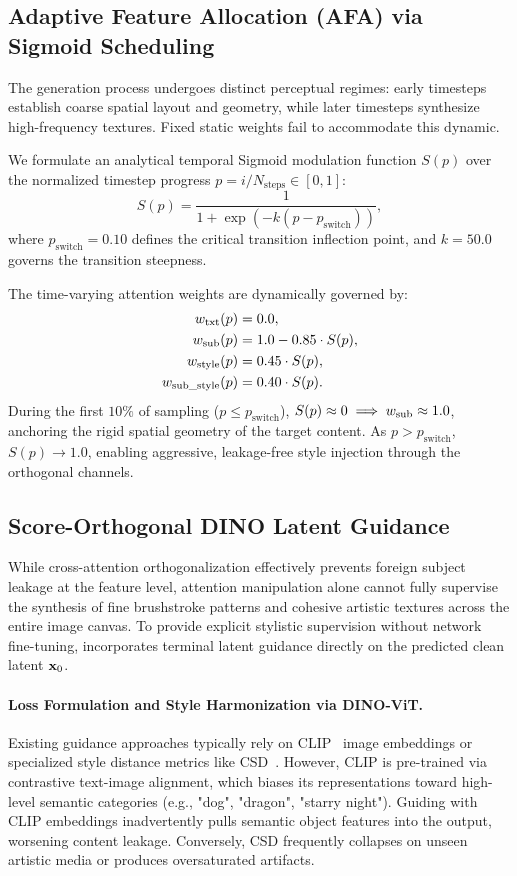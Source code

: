 \subsection{Adaptive Feature Allocation (AFA) via Sigmoid Scheduling}
\label{subsec:afa}
The generation process undergoes distinct perceptual regimes: early timesteps establish coarse spatial layout and geometry, while later timesteps synthesize high-frequency textures. Fixed static weights fail to accommodate this dynamic.

We formulate an analytical temporal Sigmoid modulation function $S(p)$ over the normalized timestep progress $p = i / N_{\text{steps}} \in [0, 1]$:
\begin{equation}
    S(p) = \frac{1}{1 + \exp\left( -k (p - p_{\text{switch}}) \right)},
    \label{eq:sigmoid_schedule}
\end{equation}
where $p_{\text{switch}} = 0.10$ defines the critical transition inflection point, and $k = 50.0$ governs the transition steepness.

The time-varying attention weights are dynamically governed by:
\begin{align}
    w_{\text{txt}}(p) &= 0.0, \\
    w_{\text{sub}}(p) &= 1.0 - 0.85 \cdot S(p), \\
    w_{\text{style}}(p) &= 0.45 \cdot S(p), \\
    w_{\text{sub\_style}}(p) &= 0.40 \cdot S(p).
\end{align}
During the first $10\%$ of sampling ($p \le p_{\text{switch}}$), $S(p) \approx 0 \implies w_{\text{sub}} \approx 1.0$, anchoring the rigid spatial geometry of the target content. As $p > p_{\text{switch}}$, $S(p) \to 1.0$, enabling aggressive, leakage-free style injection through the orthogonal channels.

\subsection{Score-Orthogonal DINO Latent Guidance}
\label{subsec:score_ortho}
While cross-attention orthogonalization effectively prevents foreign subject leakage at the feature level, attention manipulation alone cannot fully supervise the synthesis of fine brushstroke patterns and cohesive artistic textures across the entire image canvas. To provide explicit stylistic supervision without network fine-tuning, \method incorporates terminal latent guidance directly on the predicted clean latent $\mathbf{x}_0$.

\paragraph{Loss Formulation and Style Harmonization via DINO-ViT.}
Existing guidance approaches typically rely on CLIP~\cite{clip} image embeddings or specialized style distance metrics like CSD~\cite{rout2025rbmodulation}. However, CLIP is pre-trained via contrastive text-image alignment, which biases its representations toward high-level semantic categories (e.g., "dog", "dragon", "starry night"). Guiding with CLIP embeddings inadvertently pulls semantic object features into the output, worsening content leakage. Conversely, CSD frequently collapses on unseen artistic media or produces oversaturated artifacts.

